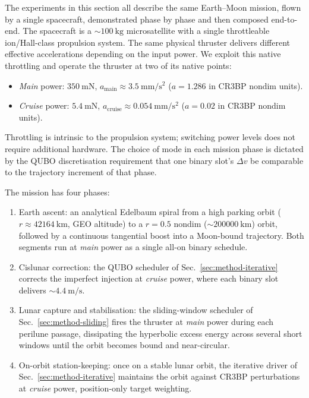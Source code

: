 \documentclass[11pt,a4paper]{article}
\theoremstyle{plain}
\begin{document}
The experiments in this section all describe the same Earth--Moon
mission, flown by a single spacecraft, demonstrated phase by phase
and then composed end-to-end. The spacecraft is a
$\sim\SI{100}{\kg}$ microsatellite with a single throttleable
ion/Hall-class propulsion system. The same physical thruster
delivers different effective accelerations depending on the input
power. We exploit this native throttling and operate the thruster
at two of its native points:
\begin{itemize}[leftmargin=1.5em, itemsep=1pt]
  \item \emph{Main} power: $\SI{350}{\milli\newton}$,
    $a_\mathrm{main} \approx \SI{3.5}{\milli\meter\per\second\squared}$
    ($a = 1.286$ in CR3BP nondim units).
  \item \emph{Cruise} power: $\SI{5.4}{\milli\newton}$,
    $a_\mathrm{cruise} \approx \SI{0.054}{\milli\meter\per\second\squared}$
    ($a = 0.02$ in CR3BP nondim units).
\end{itemize}
Throttling is intrinsic to the propulsion system; switching power
levels does not require additional hardware. The choice of mode in
each mission phase is dictated by the QUBO discretisation
requirement that one binary slot's $\Delta v$ be comparable to the
trajectory increment of that phase.

The mission has four phases:
\begin{enumerate}[leftmargin=1.5em, itemsep=1pt]
  \item[\textbf{Phase 1}] Earth ascent: an analytical Edelbaum spiral
    \cite{Edelbaum1961} from a high parking orbit
    ($r \approx \SI{42164}{\km}$, GEO altitude) to a $r = 0.5$
    nondim ($\sim \SI{200000}{\km}$) orbit, followed by a
    continuous tangential boost into a Moon-bound trajectory.
    Both segments run at \emph{main} power as a single all-on
    binary schedule.
  \item[\textbf{Phase 2}] Cislunar correction: the QUBO scheduler
    of Sec.~\ref{sec:method-iterative} corrects the imperfect
    injection at \emph{cruise} power, where each binary slot
    delivers $\sim \SI{4.4}{\meter\per\second}$.
  \item[\textbf{Phase 3}] Lunar capture and stabilisation: the
    sliding-window scheduler of Sec.~\ref{sec:method-sliding}
    fires the thruster at \emph{main} power during each perilune
    passage, dissipating the hyperbolic excess energy across
    several short windows until the orbit becomes bound and
    near-circular.
  \item[\textbf{Phase 4}] On-orbit station-keeping: once on a stable
    lunar orbit, the iterative driver of
    Sec.~\ref{sec:method-iterative} maintains the orbit against
    CR3BP perturbations at \emph{cruise} power, position-only
    target weighting.
\end{enumerate}
\end{document}
